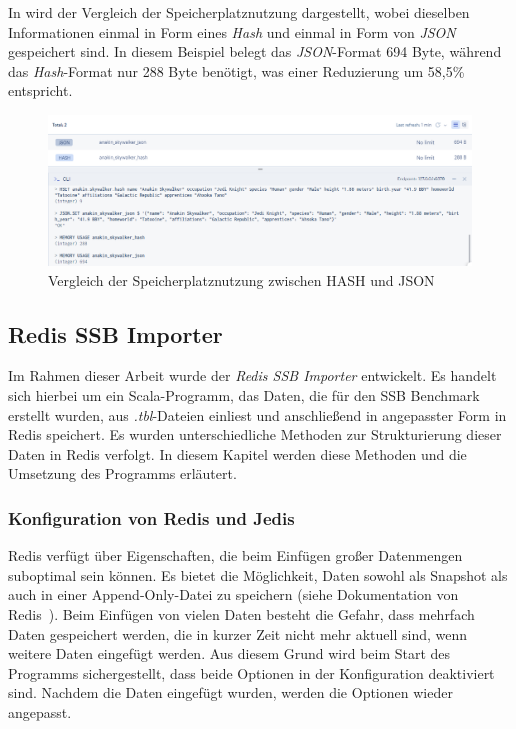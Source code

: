 In  wird der Vergleich der Speicherplatznutzung dargestellt, wobei dieselben Informationen einmal in Form eines \emph{Hash} und einmal in Form von \emph{JSON} gespeichert sind. In diesem Beispiel belegt das \emph{JSON}-Format 694 Byte, während das \emph{Hash}-Format nur 288 Byte benötigt, was einer Reduzierung um 58,5\% entspricht.
\begin{figure}[!h]  %
    \centering
    \includegraphics[width=1\textwidth]{pictures/redis/redis_hash_vs_json_memory.png}
    \caption{Vergleich der Speicherplatznutzung zwischen HASH und JSON}
    \label{pic:redis-hash-vs-json-memory}
\end{figure}

\subsection{Redis SSB Importer}\label{sec:ssb-inserter}
Im Rahmen dieser Arbeit wurde der \emph{Redis SSB Importer} entwickelt. Es handelt sich hierbei um ein Scala-Programm, das Daten, die für den SSB Benchmark erstellt wurden, aus \emph{.tbl}-Dateien einliest und anschließend in angepasster Form in Redis speichert. Es wurden unterschiedliche Methoden zur Strukturierung dieser Daten in Redis verfolgt. In diesem Kapitel werden diese Methoden und die Umsetzung des Programms erläutert.

\subsubsection{Konfiguration von Redis und Jedis}
Redis verfügt über Eigenschaften, die beim Einfügen großer Datenmengen suboptimal sein können.
Es bietet die Möglichkeit, Daten sowohl als Snapshot als auch in einer Append-Only-Datei zu speichern (siehe Dokumentation von Redis~\cite{redis_ltd_persistence_nodate}).
Beim Einfügen von vielen Daten besteht die Gefahr, dass mehrfach Daten gespeichert werden, die in kurzer Zeit nicht mehr aktuell sind, wenn weitere Daten eingefügt werden. Aus diesem Grund wird beim Start des Programms sichergestellt, dass beide Optionen in der Konfiguration deaktiviert sind. Nachdem die Daten eingefügt wurden, werden die Optionen wieder angepasst. 

